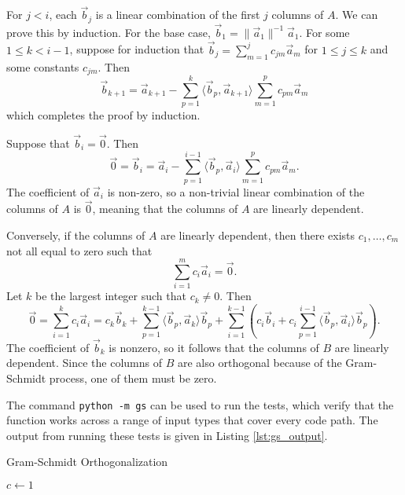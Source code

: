 \documentclass{homework}
\begin{document}
	For $j < i$, each $\vec{b}_j$ is a linear combination of the first $j$ columns of $A$. We can prove this by induction. For the base case, $\vec{b}_1 = \lVert\vec{a}_1\rVert^{-1}\vec{a}_1$. For some $1 \le k < i-1$, suppose for induction that $\vec{b}_j = \sum\limits_{m=1}^jc_{jm}\vec{a}_m$ for $1 \le j \le k$ and some constants $c_{jm}$. Then
	\begin{equation*}
		\vec{b}_{k+1} = \vec{a}_{k+1} - \sum_{p=1}^k \langle\vec{b}_p,\vec{a}_{k+1}\rangle \sum_{m=1}^p c_{pm}\vec{a}_m
	\end{equation*}
	which completes the proof by induction.
	
	Suppose that $\vec{b}_i = \vec{0}$. Then
	\begin{equation*}
		\vec{0} = \vec{b}_i = \vec{a}_i - \sum_{p=1}^{i-1}\langle\vec{b}_p, \vec{a}_i\rangle \sum_{m=1}^pc_{pm}\vec{a}_m.
	\end{equation*}
	The coefficient of $\vec{a}_i$ is non-zero, so a non-trivial linear combination of the columns of $A$ is $\vec{0}$, meaning that the columns of $A$ are linearly dependent.
	
	Conversely, if the columns of $A$ are linearly dependent, then there exists $c_1,\dots, c_m$ not all equal to zero such that
	\begin{equation*}
		\sum_{i=1}^m c_i\vec{a}_i = \vec{0}.
	\end{equation*}
	Let $k$ be the largest integer such that $c_k \ne 0$. Then
	\begin{equation*}
		\vec{0} = \sum_{i=1}^kc_i\vec{a}_i = c_k\vec{b}_k  + \sum_{p=1}^{k-1}\langle\vec{b}_p,\vec{a}_k\rangle\vec{b}_p + \sum_{i=1}^{k-1}\left(c_i\vec{b}_i + c_i\sum_{p=1}^{i-1}\langle\vec{b}_p,\vec{a}_i\rangle\vec{b}_p\right).
	\end{equation*}
	The coefficient of $\vec{b}_k$ is nonzero, so it follows that the columns of $B$ are linearly dependent. Since the columns of $B$ are also orthogonal because of the Gram-Schmidt process, one of them must be zero.
	
	The command \texttt{python -m gs} can be used to run the tests, which verify that the function works across a range of input types that cover every code path. The output from running these tests is given in Listing \ref{lst:gs_output}.
	\begin{algorithm}
		\caption{Gram-Schmidt Orthogonalization}\label{alg:gs}
		$c \gets 1$\;
	\end{algorithm}
	
	
	
\end{document}
